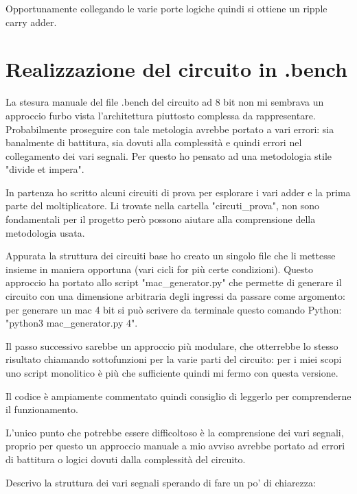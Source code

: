 \documentclass[12pt, letterpaper]{article}
\begin{document}
Opportunamente collegando le varie porte logiche quindi si ottiene un ripple carry adder.  

\section{Realizzazione del circuito in .bench}

La stesura manuale del file .bench del circuito ad 8 bit non mi sembrava un approccio furbo vista l'architettura piuttosto complessa da rappresentare. Probabilmente proseguire con tale metologia avrebbe portato a vari errori: sia banalmente di battitura, sia dovuti alla complessità e quindi errori nel collegamento dei vari segnali. Per questo ho pensato ad una metodologia stile "divide et impera".

In partenza ho scritto alcuni circuiti di prova per esplorare i vari adder e la prima parte del moltiplicatore.
Li trovate nella cartella "circuti\_prova", non sono fondamentali per il progetto però possono aiutare alla comprensione della metodologia usata.

Appurata la struttura dei circuiti base ho creato un singolo file che li mettesse insieme in maniera opportuna (vari cicli for più certe condizioni).
Questo approccio ha portato allo script "mac\_generator.py" che permette di generare il circuito con una dimensione arbitraria degli ingressi da passare come argomento: per generare un mac 4 bit si può scrivere da terminale questo comando Python: "python3 mac\_generator.py 4".  

Il passo successivo sarebbe un approccio più modulare, che otterrebbe lo stesso risultato chiamando sottofunzioni per la varie parti del circuito: per i miei scopi uno script monolitico è più che sufficiente quindi mi fermo con questa versione.

Il codice è ampiamente commentato quindi consiglio di leggerlo per comprenderne il funzionamento.

L'unico punto che potrebbe essere difficoltoso è la comprensione dei vari segnali, proprio per questo un approccio manuale a mio avviso avrebbe portato ad errori di battitura o logici dovuti dalla complessità del circuito.

Descrivo la struttura dei vari segnali sperando di fare un po' di chiarezza:
\end{document}
